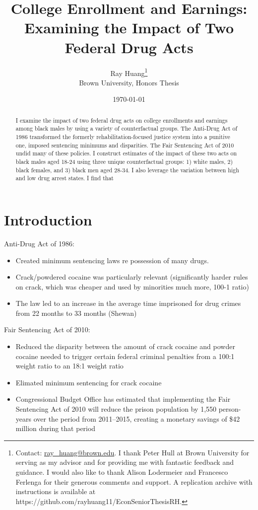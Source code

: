 \documentclass{article}
\title{College Enrollment and Earnings:
\texorpdfstring{\\}{} Examining the Impact of Two Federal Drug Acts}
\author{Ray Huang\thanks{Contact:
    \href{mailto:ray_huang@brown.edu}{ray\_huang@brown.edu}.
     I thank Peter Hull at Brown University for serving as my advisor and for providing me with fantastic feedback and guidance. I would also like to thank Alison Lodermeier and Francesco Ferlenga for their generous comments and support. A replication archive with instructions is available at https://github.com/rayhuang11/EconSeniorThesisRH.}
     \\Brown University, Honors Thesis}
\date{\today}
\begin{document}
\maketitle

\begin{abstract}
\noindent I examine the impact of two federal drug acts on college enrollments and earnings among black males by using a variety of counterfactual groups. The Anti-Drug Act of 1986 transformed the formerly rehabilitation-focused justice system into a punitive one, imposed sentencing minimums and disparities. The Fair Sentencing Act of 2010 undid many of these policies. I construct estimates of the impact of these two acts on black males aged 18-24 using three unique counterfactual groups: 1) white males, 2) black females, and 3) black men aged 28-34. I also leverage the variation between high and low drug arrest states. I find that

\end{abstract}

\clearpage

\section{Introduction}

Anti-Drug Act of 1986:
\begin{itemize}[itemsep=0.05mm, parsep=0pt]
  \item Created minimum sentencing laws re possession of many drugs. 
  \item Crack/powdered cocaine was particularly relevant (significantly harder rules on crack, which was cheaper and used by minorities much more, 100-1 ratio)
  \item The law led to an increase in the average time imprisoned for drug crimes from 22 months to 33 months (Shewan)
\end{itemize}


Fair Sentencing Act of 2010:
\begin{itemize}[itemsep=0.05mm, parsep=0pt]
  \item Reduced the disparity between the amount of crack cocaine and powder cocaine needed to trigger certain federal criminal penalties from a 100:1 weight ratio to an 18:1 weight ratio 
  \item Elimated minimum sentencing for crack cocaine 
  \item Congressional Budget Office has estimated that implementing the Fair Sentencing Act of 2010 will reduce the prison population by 1,550 person-years over the period from 2011–2015, creating a monetary savings of \$42 million during that period 
\end{itemize}
\end{document}
